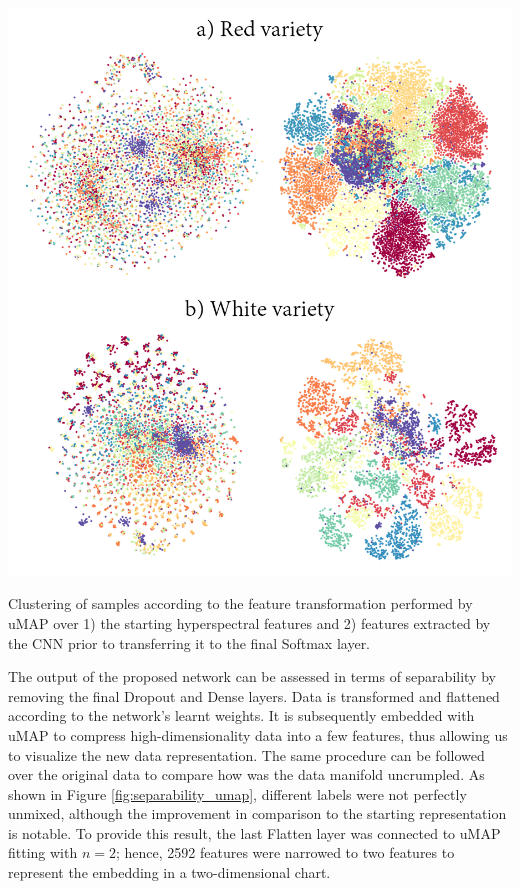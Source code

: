 \begin{marginfigure}[.1cm]
    \centering
    \includegraphics[width=\linewidth]{figs/vineyard_classification/separability.png}
	\caption{Clustering of samples according to the feature transformation performed by uMAP over 1) the starting hyperspectral features and 2) features extracted by the CNN prior to transferring it to the final Softmax layer. }
	\label{fig:separability_umap}
\end{marginfigure}
The output of the proposed network can be assessed in terms of separability by removing the final Dropout and Dense layers. Data is transformed and flattened according to the network's learnt weights. It is subsequently embedded with uMAP \cite{mcinnes_umap_2020} to compress high-dimensionality data into a few features, thus allowing us to visualize the new data representation. The same procedure can be followed over the original data to compare how was the data manifold uncrumpled. As shown in Figure \ref{fig:separability_umap}, different labels were not perfectly unmixed, although the improvement in comparison to the starting representation is notable. To provide this result, the last Flatten layer was connected to uMAP fitting with $n = 2$; hence, 2592 features were narrowed to two features to represent the embedding in a two-dimensional chart.

